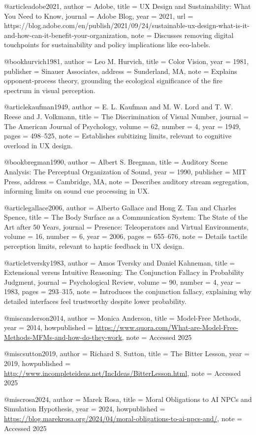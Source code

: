 @article{adobe2021,
  author    = {{Adobe}},
  title     = {UX Design and Sustainability: What You Need to Know},
  journal   = {Adobe Blog},
  year      = {2021},
  url       = {https://blog.adobe.com/en/publish/2021/09/24/sustainable-ux-design-what-is-it-and-how-can-it-benefit-your-organization},
  note      = {Discusses removing digital touchpoints for sustainability and policy implications like eco-labels.}
}

@book{hurvich1981,
  author    = {Leo M. Hurvich},
  title     = {Color Vision},
  year      = {1981},
  publisher = {Sinauer Associates},
  address   = {Sunderland, MA},
  note      = {Explains opponent-process theory, grounding the ecological significance of the fire spectrum in visual perception.}
}

@article{kaufman1949,
  author    = {E. L. Kaufman and M. W. Lord and T. W. Reese and J. Volkmann},
  title     = {The Discrimination of Visual Number},
  journal   = {The American Journal of Psychology},
  volume    = {62},
  number    = {4},
  year      = {1949},
  pages     = {498--525},
  note      = {Establishes subitizing limits, relevant to cognitive overload in UX design.}
}

@book{bregman1990,
  author    = {Albert S. Bregman},
  title     = {Auditory Scene Analysis: The Perceptual Organization of Sound},
  year      = {1990},
  publisher = {MIT Press},
  address   = {Cambridge, MA},
  note      = {Describes auditory stream segregation, informing limits on sound cue processing in UX.}
}

@article{gallace2006,
  author    = {Alberto Gallace and Hong Z. Tan and Charles Spence},
  title     = {The Body Surface as a Communication System: The State of the Art after 50 Years},
  journal   = {Presence: Teleoperators and Virtual Environments},
  volume    = {16},
  number    = {6},
  year      = {2006},
  pages     = {655--676},
  note      = {Details tactile perception limits, relevant to haptic feedback in UX design.}
}

@article{tversky1983,
  author    = {Amos Tversky and Daniel Kahneman},
  title     = {Extensional versus Intuitive Reasoning: The Conjunction Fallacy in Probability Judgment},
  journal   = {Psychological Review},
  volume    = {90},
  number    = {4},
  year      = {1983},
  pages     = {293--315},
  note      = {Introduces the conjunction fallacy, explaining why detailed interfaces feel trustworthy despite lower probability.}
}

@misc{anderson2014,
  author = {Monica Anderson},
  title = {Model-Free Methods},
  year = {2014},
  howpublished = {\url{https://www.quora.com/What-are-Model-Free-Methods-MFMs-and-how-do-they-work}},
  note = {Accessed 2025}
}

@misc{sutton2019,
  author = {Richard S. Sutton},
  title = {The Bitter Lesson},
  year = {2019},
  howpublished = {\url{http://www.incompleteideas.net/IncIdeas/BitterLesson.html}},
  note = {Accessed 2025}
}

@misc{rosa2024,
  author = {Marek Rosa},
  title = {Moral Obligations to AI NPCs and Simulation Hypothesis},
  year = {2024},
  howpublished = {\url{https://blog.marekrosa.org/2024/04/moral-obligations-to-ai-npcs-and/}},
  note = {Accessed 2025}
}
